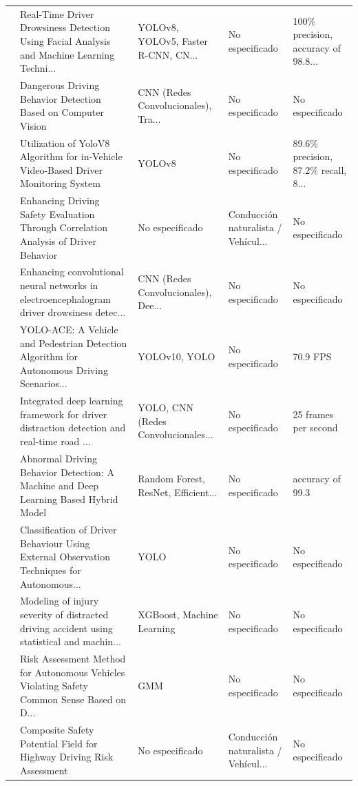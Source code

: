 \begin{table}[htbp]
\begin{tabular}{cp{7.5cm}p{2.8cm}p{2.8cm}p{2.8cm}}
\cite{essahraui2025realtime} & Real-Time Driver Drowsiness Detection Using Facial Analysis and Machine Learning Techni... & YOLOv8, YOLOv5, Faster R-CNN, CN... & No especificado & 100\% precision, accuracy of 98.8... \\
\cite{lin2025dangerous} & Dangerous Driving Behavior Detection Based on Computer Vision & CNN (Redes Convolucionales), Tra... & No especificado & No especificado \\
\cite{satya2025utilization} & Utilization of YoloV8 Algorithm for in-Vehicle Video-Based Driver Monitoring System & YOLOv8 & No especificado & 89.6\% precision, 87.2\% recall, 8... \\
\cite{fei2025enhancing} & Enhancing Driving Safety Evaluation Through Correlation Analysis of Driver Behavior & No especificado & Conducción naturalista / Vehícul... & No especificado \\
\cite{yadav2025enhancing} & Enhancing convolutional neural networks in electroencephalogram driver drowsiness detec... & CNN (Redes Convolucionales), Dee... & No especificado & No especificado \\
\cite{xie2025yoloace} & YOLO-ACE: A Vehicle and Pedestrian Detection Algorithm for Autonomous Driving Scenarios... & YOLOv10, YOLO & No especificado & 70.9 FPS \\
\cite{salakapuri2025integrated} & Integrated deep learning framework for driver distraction detection and real-time road ... & YOLO, CNN (Redes Convolucionales... & No especificado & 25 frames per second \\
\cite{uddin2025abnormal} & Abnormal Driving Behavior Detection: A Machine and Deep Learning Based Hybrid Model & Random Forest, ResNet, Efficient... & No especificado & accuracy of 99.3 \\
\cite{nell2025classification} & Classification of Driver Behaviour Using External Observation Techniques for Autonomous... & YOLO & No especificado & No especificado \\
\cite{sorum2025modeling} & Modeling of injury severity of distracted driving accident using statistical and machin... & XGBoost, Machine Learning & No especificado & No especificado \\
\cite{pang2025risk} & Risk Assessment Method for Autonomous Vehicles Violating Safety Common Sense Based on D... & GMM & No especificado & No especificado \\
\cite{zuo2025composite} & Composite Safety Potential Field for Highway Driving Risk Assessment & No especificado & Conducción naturalista / Vehícul... & No especificado \\

\end{tabular}
\end{table}
